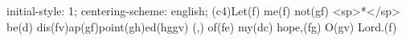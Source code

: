 initial-style: 1;
centering-scheme: english;
(c4)Let(f) me(f) not(gf) <sp>*</sp> be(d) dis(fv)ap(gf)point(gh)ed(hggv) (,) of(fe) my(dc) hope,(fg) O(gv) Lord.(f)

